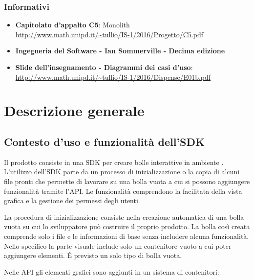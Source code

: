\subsubsection{Informativi}
\begin{itemize}
\item
  \textbf{Capitolato d'appalto C5}: Monolith \\
  \url{http://www.math.unipd.it/~tullio/IS-1/2016/Progetto/C5.pdf}
\item \textbf{Ingegneria del Software - Ian Sommerville - Decima edizione}
\item \textbf{Slide dell’insegnamento - Diagrammi dei casi d’uso}:
  \\ \url{http://www.math.unipd.it/~tullio/IS-1/2016/Dispense/E01b.pdf}

\end{itemize}


\section{Descrizione generale}
\subsection{Contesto d'uso e funzionalità dell'SDK}

Il prodotto consiste in una SDK per creare bolle interattive
in ambiente .
L'utilizzo dell'SDK parte da un processo di inizializzazione 
o la copia di alcuni file pronti che permette di lavorare su
una bolla vuota a cui si possono aggiungere funzionalità tramite
l'API.
Le funzionalità comprendono la facilitata della vista
grafica e la gestione dei permessi degli utenti.

La procedura di inizializzazione consiste nella creazione automatica di una bolla
vuota su cui lo sviluppatore può costruire il proprio prodotto.
La bolla così creata comprende solo i file e le informazioni di base
senza includere alcuna funzionalità. Nello specifico la parte visuale include
solo un contenitore vuoto a cui poter aggiungere elementi.
\'E previsto un solo tipo di bolla vuota.



Nelle API gli elementi grafici sono aggiunti in un sistema di contenitori:

